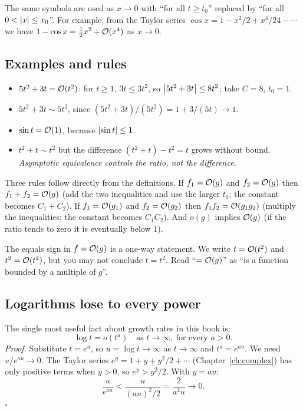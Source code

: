 The same symbols are used as $x\to0$ with ``for all $t\ge t_0$'' replaced by ``for all $0<\left\lvert x\right\rvert\le x_0$''. For example, from the Taylor series $\cos x=1-x^2/2+x^4/24-\cdots$ we have $1-\cos x=\tfrac12x^2+\mathcal{O}(x^4)$ as $x\to0$.

\subsection{Examples and rules}

\begin{itemize}
\item $5t^2+3t=\mathcal{O}(t^2)$: for $t\ge1$, $3t\le3t^2$, so $\left\lvert 5t^2+3t\right\rvert\le 8t^2$; take $C=8$, $t_0=1$.
\item $5t^2+3t\sim 5t^2$, since $(5t^2+3t)/(5t^2)=1+3/(5t)\to1$.
\item $\sin t=\mathcal{O}(1)$, because $\left\lvert \sin t\right\rvert\le1$.
\item $t^2+t\sim t^2$ but the difference $(t^2+t)-t^2=t$ grows without bound. \emph{Asymptotic equivalence controls the ratio, not the difference.}
\end{itemize}

Three rules follow directly from the definitions. If $f_1=\mathcal{O}(g)$ and $f_2=\mathcal{O}(g)$ then $f_1+f_2=\mathcal{O}(g)$ (add the two inequalities and use the larger $t_0$; the constant becomes $C_1+C_2$). If $f_1=\mathcal{O}(g_1)$ and $f_2=\mathcal{O}(g_2)$ then $f_1f_2=\mathcal{O}(g_1g_2)$ (multiply the inequalities; the constant becomes $C_1C_2$). And $o(g)$ implies $\mathcal{O}(g)$ (if the ratio tends to zero it is eventually below $1$).

\begin{pitfall}
The equals sign in $f=\mathcal{O}(g)$ is a one-way statement. We write $t=\mathcal{O}(t^2)$ and $t^2=\mathcal{O}(t^2)$, but you may not conclude $t=t^2$. Read ``$=\mathcal{O}(g)$'' as ``is a function bounded by a multiple of $g$''.
\end{pitfall}

\subsection{Logarithms lose to every power}

The single most useful fact about growth rates in this book is:
\begin{equation}
\log t=o(t^{a})\quad\text{as } t\to\infty,\ \text{for every } a>0.
\label{eq:asymptotics-logpower}
\end{equation}
\emph{Proof.} Substitute $t=e^u$, so $u=\log t\to\infty$ as $t\to\infty$ and $t^a=e^{au}$. We need $u/e^{au}\to0$. The Taylor series $e^{y}=1+y+y^2/2+\cdots$ (Chapter~\ref{ch:complex}) has only positive terms when $y>0$, so $e^{y}>y^2/2$. With $y=au$:
\[
\frac{u}{e^{au}}<\frac{u}{(au)^2/2}=\frac{2}{a^2u}\longrightarrow 0.
\]
\hfill$\square$

